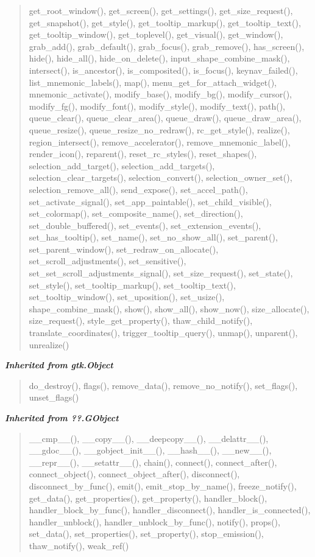 \begin{quote}
get\_root\_window(), get\_screen(), get\_settings(), get\_size\_request(), get\_snapshot(), get\_style(), get\_tooltip\_markup(), get\_tooltip\_text(), get\_tooltip\_window(), get\_toplevel(), get\_visual(), get\_window(), grab\_add(), grab\_default(), grab\_focus(), grab\_remove(), has\_screen(), hide(), hide\_all(), hide\_on\_delete(), input\_shape\_combine\_mask(), intersect(), is\_ancestor(), is\_composited(), is\_focus(), keynav\_failed(), list\_mnemonic\_labels(), map(), menu\_get\_for\_attach\_widget(), mnemonic\_activate(), modify\_base(), modify\_bg(), modify\_cursor(), modify\_fg(), modify\_font(), modify\_style(), modify\_text(), path(), queue\_clear(), queue\_clear\_area(), queue\_draw(), queue\_draw\_area(), queue\_resize(), queue\_resize\_no\_redraw(), rc\_get\_style(), realize(), region\_intersect(), remove\_accelerator(), remove\_mnemonic\_label(), render\_icon(), reparent(), reset\_rc\_styles(), reset\_shapes(), selection\_add\_target(), selection\_add\_targets(), selection\_clear\_targets(), selection\_convert(), selection\_owner\_set(), selection\_remove\_all(), send\_expose(), set\_accel\_path(), set\_activate\_signal(), set\_app\_paintable(), set\_child\_visible(), set\_colormap(), set\_composite\_name(), set\_direction(), set\_double\_buffered(), set\_events(), set\_extension\_events(), set\_has\_tooltip(), set\_name(), set\_no\_show\_all(), set\_parent(), set\_parent\_window(), set\_redraw\_on\_allocate(), set\_scroll\_adjustments(), set\_sensitive(), set\_set\_scroll\_adjustments\_signal(), set\_size\_request(), set\_state(), set\_style(), set\_tooltip\_markup(), set\_tooltip\_text(), set\_tooltip\_window(), set\_uposition(), set\_usize(), shape\_combine\_mask(), show(), show\_all(), show\_now(), size\_allocate(), size\_request(), style\_get\_property(), thaw\_child\_notify(), translate\_coordinates(), trigger\_tooltip\_query(), unmap(), unparent(), unrealize()
\end{quote}

\large{\textbf{\textit{Inherited from gtk.Object}}}

\begin{quote}
do\_destroy(), flags(), remove\_data(), remove\_no\_notify(), set\_flags(), unset\_flags()
\end{quote}

\large{\textbf{\textit{Inherited from ??.GObject}}}

\begin{quote}
\_\_cmp\_\_(), \_\_copy\_\_(), \_\_deepcopy\_\_(), \_\_delattr\_\_(), \_\_gdoc\_\_(), \_\_gobject\_init\_\_(), \_\_hash\_\_(), \_\_new\_\_(), \_\_repr\_\_(), \_\_setattr\_\_(), chain(), connect(), connect\_after(), connect\_object(), connect\_object\_after(), disconnect(), disconnect\_by\_func(), emit(), emit\_stop\_by\_name(), freeze\_notify(), get\_data(), get\_properties(), get\_property(), handler\_block(), handler\_block\_by\_func(), handler\_disconnect(), handler\_is\_connected(), handler\_unblock(), handler\_unblock\_by\_func(), notify(), props(), set\_data(), set\_properties(), set\_property(), stop\_emission(), thaw\_notify(), weak\_ref()
\end{quote}

